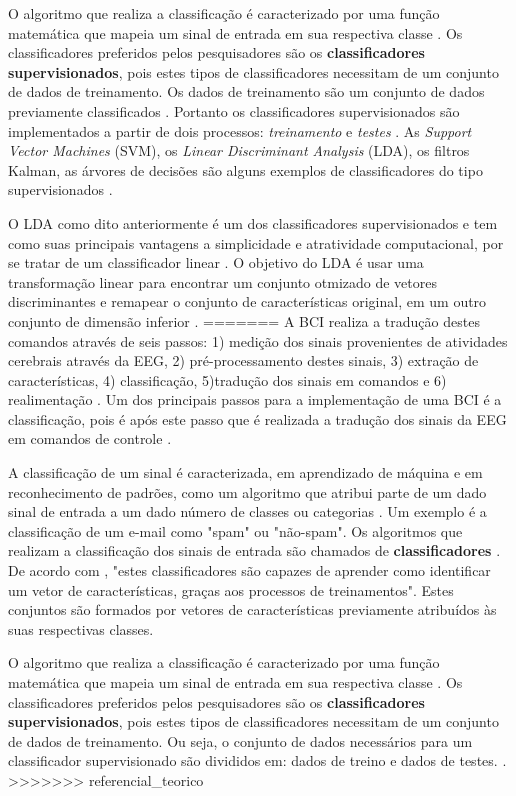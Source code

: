 O algoritmo que realiza a classificação é caracterizado por uma função matemática
que mapeia um sinal de entrada em sua respectiva classe \cite{lottephd}. Os classificadores
preferidos pelos pesquisadores são os \textbf{classificadores supervisionados}, pois estes
tipos de classificadores necessitam de um conjunto de dados de treinamento. Os dados de treinamento são um conjunto de dados previamente classificados \cite{Siulybook}. Portanto os classificadores supervisionados são implementados a partir de dois processos: \textit{treinamento} e \textit{testes} \cite{Siulybook}. As \textit{Support Vector Machines} (SVM), os \textit{Linear Discriminant Analysis} (LDA), os filtros Kalman, as árvores de decisões são alguns exemplos de classificadores do tipo supervisionados \cite{Siulybook}.

O LDA como dito anteriormente é um dos classificadores supervisionados e tem como suas principais vantagens
a simplicidade e atratividade computacional, por se tratar de um classificador linear \cite{patternRecogn}.
O objetivo do LDA é usar uma transformação linear para encontrar um conjunto otmizado de vetores
discriminantes e remapear o conjunto de características
original, em um outro conjunto de dimensão  inferior \cite{ShashoaLDA}.
=======
A BCI realiza a tradução destes comandos através de seis passos: 1) medição dos sinais provenientes de atividades cerebrais através da EEG, 2) pré-processamento destes sinais, 3) extração de características, 4) classificação, 5)tradução dos sinais em comandos e 6) realimentação \cite{MasonAndBirch}. Um dos principais passos para a implementação de uma BCI é a classificação, pois é após este passo que é realizada a tradução dos sinais da EEG em comandos de controle \cite{MasonAndBirch}.

A classificação de um sinal é caracterizada, em aprendizado de máquina e em reconhecimento de padrões, como um algoritmo que atribui parte de um dado sinal de entrada a um dado número de classes ou categorias \cite{brunelli2009template}. Um exemplo é a classificação de um e-mail como "spam" ou "não-spam". Os algoritmos que realizam a classificação dos sinais de entrada são chamados de \textbf{classificadores} \cite{Siulybook}. De acordo com \cite{lottephd}, "estes classificadores são capazes de aprender como identificar um vetor de características, graças aos processos de treinamentos". Estes conjuntos são formados por vetores de características previamente atribuídos às suas respectivas classes.

O algoritmo que realiza a classificação é caracterizado por uma função matemática que mapeia um sinal de entrada em sua respectiva classe \cite{lottephd}. Os classificadores preferidos pelos pesquisadores são os \textbf{classificadores supervisionados}, pois estes tipos de classificadores necessitam de um conjunto de dados de treinamento. Ou seja, o conjunto de dados necessários para um classificador supervisionado são divididos em: dados de treino e dados de testes. \cite{Siulybook}.
>>>>>>> referencial_teorico

